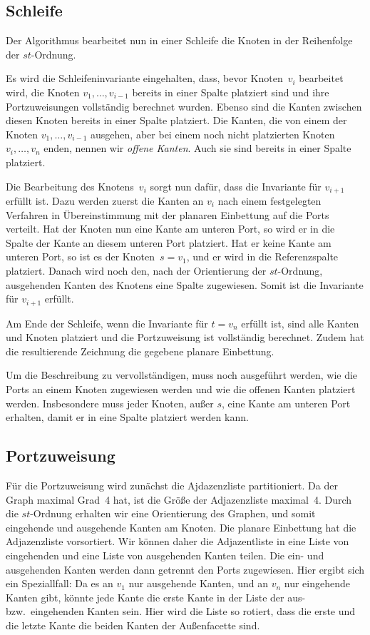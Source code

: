 \documentclass[a4paper]{scrreprt}
\theoremstyle{definition}
\begin{document}
\subsection{Schleife}

Der Algorithmus bearbeitet nun in einer Schleife die Knoten in der Reihenfolge der $st$-Ordnung.

Es wird die Schleifeninvariante eingehalten, dass, bevor Knoten~$v_i$ bearbeitet wird, die Knoten $v_1, \dots, v_{i-1}$ bereits in einer Spalte platziert sind und ihre Portzuweisungen vollständig berechnet wurden. Ebenso sind die Kanten zwischen diesen Knoten bereits in einer Spalte platziert. Die Kanten, die von einem der Knoten $v_1, \dots, v_{i-1}$ ausgehen, aber bei einem noch nicht platzierten Knoten $v_i, \dots, v_n$ enden, nennen wir \emph{offene Kanten}. Auch sie sind bereits in einer Spalte platziert.

Die Bearbeitung des Knotens~$v_i$ sorgt nun dafür, dass die Invariante für $v_{i+1}$ erfüllt ist. Dazu werden zuerst die Kanten an $v_i$ nach einem festgelegten Verfahren in Übereinstimmung mit der planaren Einbettung auf die Ports verteilt. Hat der Knoten nun eine Kante am unteren Port, so wird er in die Spalte der Kante an diesem unteren Port platziert. Hat er keine Kante am unteren Port, so ist es der Knoten~$s = v_1$, und er wird in die Referenzspalte platziert. Danach wird noch den, nach der Orientierung der $st$-Ordnung, ausgehenden Kanten des Knotens eine Spalte zugewiesen. Somit ist die Invariante für $v_{i+1}$ erfüllt.

Am Ende der Schleife, wenn die Invariante für $t = v_n$ erfüllt ist, sind alle Kanten und Knoten platziert und die Portzuweisung ist vollständig berechnet. Zudem hat die resultierende Zeichnung die gegebene planare Einbettung.

Um die Beschreibung zu vervollständigen, muss noch ausgeführt werden, wie die Ports an einem Knoten zugewiesen werden und wie die offenen Kanten platziert werden. Insbesondere muss jeder Knoten, außer $s$, eine Kante am unteren Port erhalten, damit er in eine Spalte platziert werden kann.

\subsection{Portzuweisung}
\label{sec:portdistribution}

Für die Portzuweisung wird zunächst die Ajdazenzliste partitioniert. Da der Graph maximal Grad~4 hat, ist die Größe der Adjazenzliste maximal~4. Durch die $st$-Ordnung erhalten wir eine Orientierung des Graphen, und somit eingehende und ausgehende Kanten am Knoten. Die planare Einbettung hat die Adjazenzliste vorsortiert. Wir können daher die Adjazentliste in eine Liste von eingehenden und eine Liste von ausgehenden Kanten teilen. Die ein- und ausgehenden Kanten werden dann getrennt den Ports zugewiesen. Hier ergibt sich ein Speziallfall: Da es an $v_1$ nur ausgehende Kanten, und an $v_n$ nur eingehende Kanten gibt, könnte jede Kante die erste Kante in der Liste der aus- bzw.\ eingehenden Kanten sein. Hier wird die Liste so rotiert, dass die erste und die letzte Kante die beiden Kanten der Außenfacette sind.
\end{document}
